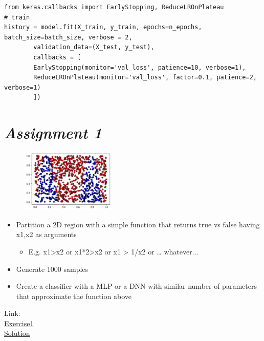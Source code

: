 \begin{verbatim}
from keras.callbacks import EarlyStopping, ReduceLROnPlateau
# train
history = model.fit(X_train, y_train, epochs=n_epochs, batch_size=batch_size, verbose = 2,
		validation_data=(X_test, y_test),
		callbacks = [
		EarlyStopping(monitor='val_loss', patience=10, verbose=1),
		ReduceLROnPlateau(monitor='val_loss', factor=0.1, patience=2, verbose=1)
		])
\end{verbatim}

\section{\textit{Assignment 1}}

\begin{figure}
	\includegraphics[width=0.4\textwidth]{figure_ml/ass1.png}
\end{figure} 
\quad
\begin{itemize}
	\item Partition a 2D region with a simple function that returns true vs false having x1,x2 as arguments
	\begin{itemize}
		\item E.g. x1>x2 or x1*2>x2 or x1 > 1/x2 or … whatever...
	\end{itemize}
	\item Generate 1000 samples
	\item Create a classifier with a MLP or a DNN with similar number of parameters that approximate the function above
\end{itemize}
Link: \\
\href{https://colab.research.google.com/drive/1OOZIT1AFV7IaHajrruOJ6AmZeZkGeBJa?usp=sharing}{Exercise1}\\
\href{https://colab.research.google.com/drive/1ghow_mdPfIOPkALZAS2ubUxIUFRwhotS?usp=sharing}{Solution}

